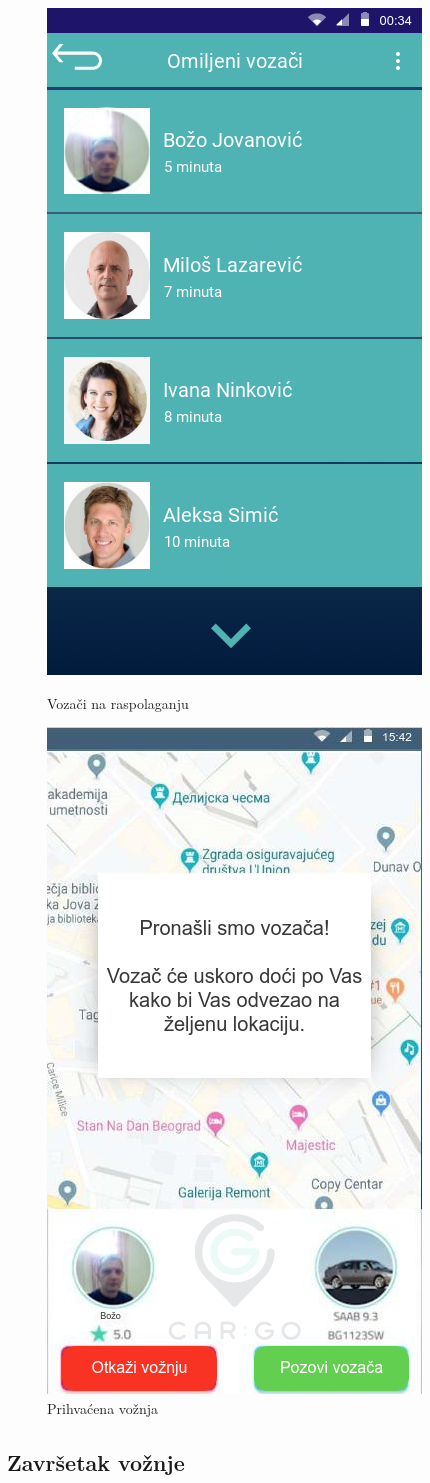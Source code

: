 \begin{figure}[H]
\centering
\begin{minipage}{.5\textwidth}
  \centering
  \includegraphics[width=.4\linewidth]{Slike/vozaci_na_raspolaganju.png}
  \caption{Vozači na raspolaganju}
  \label{fig:Vozaci na raspolaganju}
\end{minipage}%
\begin{minipage}{.5\textwidth}
  \centering
  \includegraphics[width=.4\linewidth]{Slike/Prihvacena_voznja.png}
   \caption{Prihvaćena vožnja}
   \label{fig:Prihvacena voznja}
\end{minipage}
\end{figure}

\newpage

\subsection{\bfseries Završetak vožnje}

